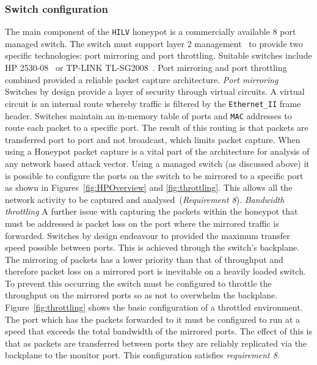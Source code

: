 \subsubsection{Switch configuration}
The main component of the \texttt{HILV} honeypot is a commercially available 8 port managed switch. The switch must support layer 2 management~\cite{ST:98} to provide two specific technologies: port mirroring and port throttling. Suitable switches include HP 2530-08~\cite{HP:17} or TP-LINK TL-SG2008~\cite{TP:17}. Port mirroring and port throttling combined provided a reliable packet capture architecture.
\newline\newline
\noindent\textit{Port mirroring}
\newline\newline
Switches by design provide a layer of security through virtual circuits. A virtual circuit is an internal route whereby traffic is filtered by the \texttt{Ethernet\_II} frame header. Switches maintain an in-memory table of ports and \texttt{MAC} addresses to route each packet to a specific port. The result of this routing is that packets are transferred port to port and not broadcast, which limits packet capture. When using a Honeypot packet capture is a vital part of the architecture for analysis of any network based attack vector. Using a managed switch (as discussed above) it is possible to configure the ports on the switch to be mirrored to a specific port as shown in Figures~\ref{fig:HPOverview} and \ref{fig:throttling}. This allows all the network activity to be captured and analysed~(\emph{Requirement 8}). 
\newline\newline
\noindent \textit{Bandwidth throttling}
\newline\newline
A further issue with capturing the packets within the honeypot that must be addressed is packet loss on the port where the mirrored traffic is forwarded. Switches by design endeavour to provided the maximum transfer speed possible between ports. This is achieved through the switch's backplane. The mirroring of packets has a lower priority than that of throughput and therefore packet loss on a mirrored port is inevitable on a heavily loaded switch. To prevent this occurring the switch must be configured to throttle the throughput on the mirrored ports so as not to overwhelm the backplane. Figure~\ref{fig:throttling} shows the basic configuration of a throttled environment. The port which has the packets forwarded to it must be configured to run at a speed that exceeds the total bandwidth of the mirrored ports. The effect of this is that as packets are transferred between ports they are reliably replicated via the backplane to the monitor port. This configuration satisfies \emph{requirement 8}.

